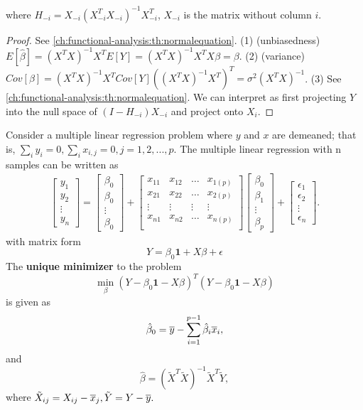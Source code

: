 \begin{refsection}
\begin{theorem}
\begin{itemize}
		where $H_{-i} = X_{-i}(X_{-i}^TX_{-i})^{-1} X_{-i}^T$, $X_{-i}$ is the matrix without column $i$.
	\end{itemize}
\end{theorem}
\begin{proof}
	See \autoref{ch:functional-analysis:th:normalequation}.
	(1) (unbiasedness) $E[\hat{\beta}] = (X^TX)^{-1}X^T E[Y] = (X^TX)^{-1}X^TX\beta = \beta.$
	(2) (variance) $Cov[\beta] = (X^TX)^{-1}X^TCov[Y]((X^TX)^{-1}X^T)^T = \sigma^2(X^TX)^{-1}$.
	(3) See \autoref{ch:functional-analysis:th:normalequation}. We can interpret as first projecting $Y$ into the null space of $(I-H_{-i})X_{-i}$ and project onto $X_i$. 
\end{proof}

\begin{theorem}\label{ch:statistical-models:th:leastSquareSolutionDemeanCase}
Consider a multiple linear regression problem where $y$ and $x$ are demeaned; that is, $\sum_i y_i = 0, \sum_{i}x_{i,j} = 0, j=1,2,...,p$. 	The multiple linear regression with n samples can be written as
\begin{align*}
\begin{bmatrix}
y_1\\
y_2\\
\vdots\\
y_n
\end{bmatrix} = \begin{bmatrix}
\beta_0\\
\beta_0\\
\vdots\\
\beta_0
\end{bmatrix}+\begin{bmatrix}
x_{11} & x_{12} & \dots & x_{1(p)}\\
x_{21} & x_{22} & \dots & x_{2(p)}\\
\vdots & \vdots & \vdots & \vdots \\
x_{n1} & x_{n2} & \dots & x_{n(p)}\\
\end{bmatrix}
\begin{bmatrix}
\beta_0\\
\beta_1\\
\vdots\\
\beta_{p}
\end{bmatrix}
+ \begin{bmatrix}
\epsilon_1\\
\epsilon_2\\
\vdots\\
\epsilon_{n}
\end{bmatrix}.
\end{align*}
	with matrix form
	$$Y = \beta_0\bm{1} + X\beta + \epsilon$$
	The \textbf{unique minimizer} to the problem 
	$$\min_\beta (Y-\beta_0\bm{1} -X\beta)^T(Y - \beta_0\bm{1} - X\beta)$$
	is given as
	$$\hat{\beta}_0 = \overline{y} - \sum_{i=1}^{p-1} \hat{\beta}_i \overline{x}_i,$$
	and
	$$\hat{\beta} = (\tilde{X}^T\tilde{X})^{-1}\tilde{X}^T\tilde{Y},$$
	where $\tilde{X}_{ij} = X_{ij} - \overline{x}_j, \tilde{Y} = Y - \overline{y}.$
	

\end{theorem}
\end{refsection}
